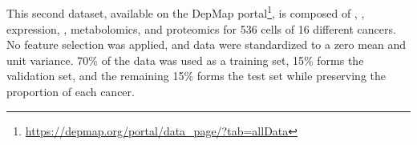 \documentclass[../main.tex]{subfiles}
\begin{document}
	\subsection{}\label{sec:data_ccle}
		This second dataset, available on the DepMap portal\footnote{\url{https://depmap.org/portal/data_page/?tab=allData}}, is composed of , ,  expression, , metabolomics, and proteomics for 536 cells of 16 different cancers.
		No feature selection was applied, and data were standardized to a zero mean and unit variance.
		70\% of the data was used as a training set, 15\% forms the validation set, and the remaining 15\% forms the test set while preserving the proportion of each cancer.
\end{document}
